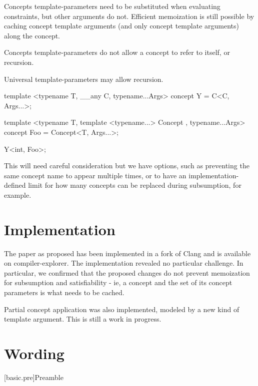 \documentclass{wg21}
\begin{document}
Concepts template-parameters need to be substituted when evaluating constraints, but other arguments do not.
Efficient memoization is still possible by caching concept template arguments (and only concept template arguments) along the concept.

Concepts template-parameters do not allow a concept to refer to itself, or recursion.

Universal template-parameters may allow recursion.

\begin{colorblock}
template <typename T, __any C, typename...Args>
concept Y = C<C, Args...>;

template <typename T, template <typename...> Concept , typename...Args>
concept Foo = Concept<T, Args...>;

Y<int, Foo>;
\end{colorblock}

This will need careful consideration but we have options, such as preventing the same concept name to appear multiple times,
or to have an implementation-defined limit for how many concepts can be replaced during subsumption, for example.

\section{Implementation}

The paper as proposed has been implemented in a fork of Clang and is available on compiler-explorer.
The implementation revealed no particular challenge. In particular, we confirmed that the proposed changes
do not prevent memoization for subsumption and satisfiability - ie, a concept and the set of its concept parameters
is what needs to be cached.

Partial concept application was also implemented, modeled by a new kind of template argument.
This is still a work in progress.

\section{Wording}

[basic.pre]{Preamble}
\end{document}
